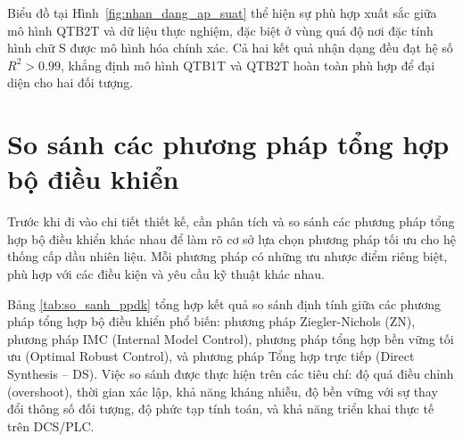 \documentclass[../main.tex]{subfiles}
\begin{document}
Biểu đồ tại Hình~\ref{fig:nhan_dang_ap_suat} thể hiện sự phù hợp xuất sắc giữa mô hình QTB2T và dữ liệu thực nghiệm, đặc biệt ở vùng quá độ nơi đặc tính hình chữ S được mô hình hóa chính xác. Cả hai kết quả nhận dạng đều đạt hệ số $R^2 > 0.99$, khẳng định mô hình QTB1T và QTB2T hoàn toàn phù hợp để đại diện cho hai đối tượng.

\section{So sánh các phương pháp tổng hợp bộ điều khiển}

Trước khi đi vào chi tiết thiết kế, cần phân tích và so sánh các phương pháp tổng hợp bộ điều khiển khác nhau để làm rõ cơ sở lựa chọn phương pháp tối ưu cho hệ thống cấp dầu nhiên liệu. Mỗi phương pháp có những ưu nhược điểm riêng biệt, phù hợp với các điều kiện và yêu cầu kỹ thuật khác nhau.

Bảng \ref{tab:so_sanh_ppdk} tổng hợp kết quả so sánh định tính giữa các phương pháp tổng hợp bộ điều khiển phổ biến: phương pháp Ziegler-Nichols (ZN), phương pháp IMC (Internal Model Control), phương pháp tổng hợp bền vững tối ưu (Optimal Robust Control), và phương pháp Tổng hợp trực tiếp (Direct Synthesis -- DS). Việc so sánh được thực hiện trên các tiêu chí: độ quá điều chỉnh (overshoot), thời gian xác lập, khả năng kháng nhiễu, độ bền vững với sự thay đổi thông số đối tượng, độ phức tạp tính toán, và khả năng triển khai thực tế trên DCS/PLC.

\begin{table}[H]
\centering
\caption{So sánh các phương pháp tổng hợp bộ điều khiển}
\label{tab:so_sanh_ppdk}
\end{table}
\end{document}
